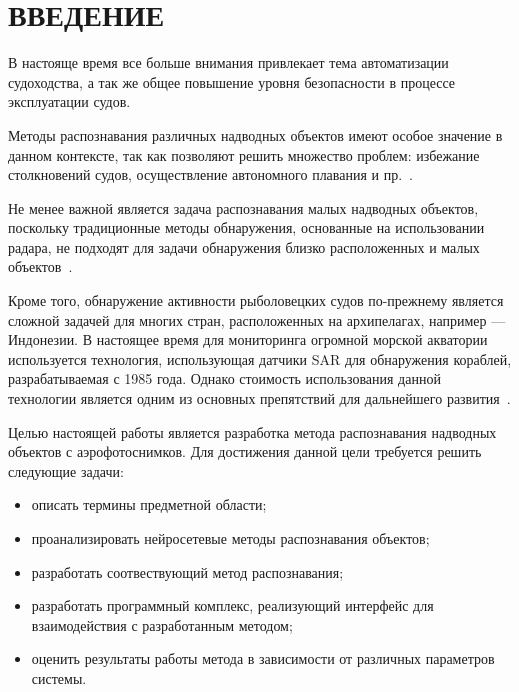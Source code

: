\chapter*{ВВЕДЕНИЕ}

В настояще время все больше внимания привлекает тема автоматизации судоходства, а так же общее повышение уровня безопасности в процессе эксплуатации судов.

Методы распознавания различных надводных объектов имеют особое значение в данном контексте, так как позволяют решить множество проблем: избежание столкновений судов, осуществление автономного плавания и пр.~\cite{ship-detection}.

Не менее важной является задача распознавания малых надводных объектов, поскольку традиционные методы обнаружения, основанные на использовании радара, не подходят для задачи обнаружения близко расположенных и малых объектов~\cite{small-ship-detection}.

Кроме того, обнаружение активности рыболовецких судов по-прежнему является сложной задачей для многих стран, расположенных на архипелагах, например --- Индонезии. В настоящее время для мониторинга огромной морской акватории используется технология, использующая датчики SAR для обнаружения кораблей, разрабатываемая с 1985 года. Однако стоимость использования данной технологии является одним из основных препятствий для дальнейшего развития~\cite{fishing-boat-detection-using-sentinel-1}.

Целью настоящей работы является разработка метода распознавания надводных объектов с аэрофотоснимков. Для достижения данной цели требуется решить следующие задачи:
\begin{itemize}[label=---]
    \item описать термины предметной области;
    \item проанализировать нейросетевые методы распознавания объектов;
    \item разработать соотвествующий метод распознавания;
    \item разработать программный комплекс, реализующий интерфейс для взаимодействия с разработанным методом;
    \item оценить результаты работы метода в зависимости от различных параметров системы.
\end{itemize}